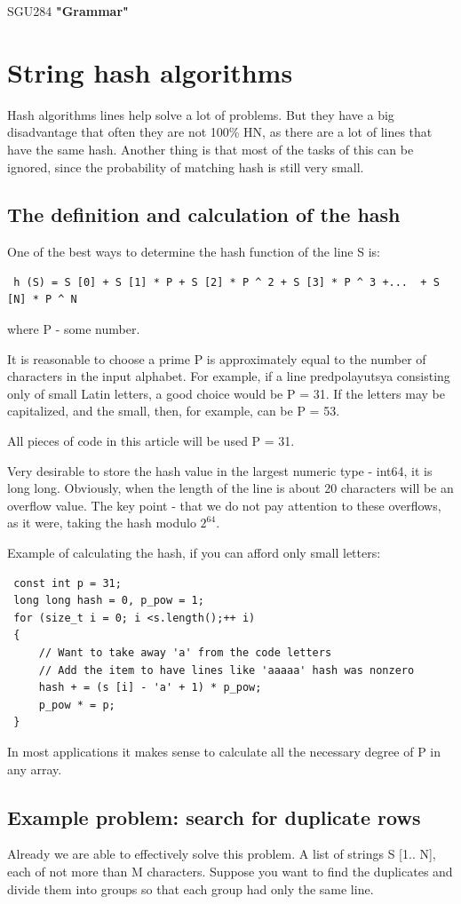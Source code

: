 SGU284 \textbf{"Grammar"}

\section{ String hash algorithms }
Hash algorithms lines help solve a lot of problems. But they have a big disadvantage that often they are not 100\% HN, as there are a lot of lines that have the same hash. Another thing is that most of the tasks of this can be ignored, since the probability of matching hash is still very small.

\subsection{ The definition and calculation of the hash }
One of the best ways to determine the hash function of the line S is:
\begin{verbatim}
 h (S) = S [0] + S [1] * P + S [2] * P ^ 2 + S [3] * P ^ 3 +...  + S [N] * P ^ N
\end{verbatim}
where P - some number.

It is reasonable to choose a prime P is approximately equal to the number of characters in the input alphabet. For example, if a line predpolayutsya consisting only of small Latin letters, a good choice would be P = 31. If the letters may be capitalized, and the small, then, for example, can be P = 53.

All pieces of code in this article will be used P = 31.

Very desirable to store the hash value in the largest numeric type - int64, it is long long. Obviously, when the length of the line is about 20 characters will be an overflow value. The key point - that we do not pay attention to these overflows, as it were, taking the hash modulo $2 ^ 64$.

Example of calculating the hash, if you can afford only small letters:
\begin{verbatim}
 const int p = 31;
 long long hash = 0, p_pow = 1;
 for (size_t i = 0; i <s.length();++ i)
 {
     // Want to take away 'a' from the code letters
     // Add the item to have lines like 'aaaaa' hash was nonzero
     hash + = (s [i] - 'a' + 1) * p_pow;
     p_pow * = p;
 } 
\end{verbatim}
In most applications it makes sense to calculate all the necessary degree of P in any array.

\subsection{ Example problem: search for duplicate rows }
Already we are able to effectively solve this problem. A list of strings S [1.. N], each of not more than M characters. Suppose you want to find the duplicates and divide them into groups so that each group had only the same line.

